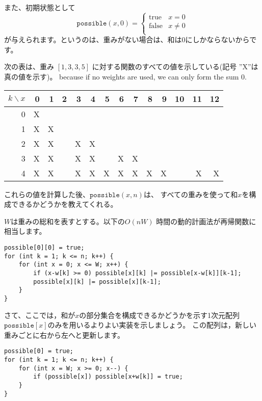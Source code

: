 また、初期状態として
\begin{equation*}
    \texttt{possible}(x,0) = \begin{cases}
               \textrm{true}    & x = 0\\
               \textrm{false}   & x \neq 0 \\
           \end{cases}
\end{equation*}
が与えられます。というのは、重みがない場合は、和は0にしかならないからです。

次の表は、重み $[1,3,3,5]$  に対する関数のすべての値を示している(記号 ''X''は真の値を示す)。
because if no weights are used,
we can only form the sum 0.

\begin{center}
\begin{tabular}{r|rrrrrrrrrrrrr}
$k \backslash x$ & 0 & 1 & 2 & 3 & 4 & 5 & 6 & 7 & 8 & 9 & 10 & 11 & 12 \\
\hline
 0 & X & \\
 1 & X & X \\
 2 & X & X & & X & X \\
 3 & X & X & & X & X & & X & X \\
 4 & X & X & & X & X & X & X & X & X & X & & X & X \\
\end{tabular}
\end{center}

これらの値を計算した後、$\texttt{possible}(x,n)$は、
すべての重みを使って和$x$を構 成できるかどうかを教えてくれる。

$W$は重みの総和を表すとする。以下の$O(nW)$ 時間の動的計画法が再帰関数に相当します。
\begin{lstlisting}
possible[0][0] = true;
for (int k = 1; k <= n; k++) {
    for (int x = 0; x <= W; x++) {
        if (x-w[k] >= 0) possible[x][k] |= possible[x-w[k]][k-1];
        possible[x][k] |= possible[x][k-1];
    }
}
\end{lstlisting}

さて、ここでは，和が$x$の部分集合を構成できるかどうかを示す1次元配列
$\texttt{possible}[x]$のみを用いるよりよい実装を示しましょう。
この配列は，新しい重みごとに右から左へと更新します。

\begin{lstlisting}
possible[0] = true;
for (int k = 1; k <= n; k++) {
    for (int x = W; x >= 0; x--) {
        if (possible[x]) possible[x+w[k]] = true;
    }
}
\end{lstlisting}


